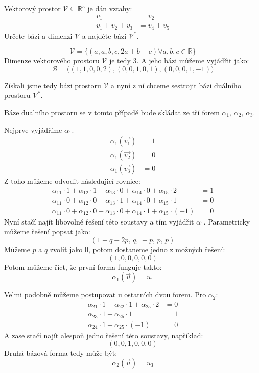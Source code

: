 \begin{example}
    Vektorový prostor $\mathcal{V} \subseteq \mathbb{R}^5$ je dán vztahy:
    \begin{align*}
        v_1 &= v_2\\
        v_1 + v_2 + v_3 &= v_4 + v_5
    \end{align*}
    Určete bázi a dimenzi $\mathcal{V}$ a najděte bázi $\mathcal{V}^*$.

    $$\mathcal{V} = \{(a, a, b, c, 2a + b -c) \forall a, b, c \in \mathbb{R}\}$$
    Dimenze vektorového prostoru $\mathcal{V}$ je  tedy 3.
    A jeho bázi můžeme vyjádřit jako:
    $$\mathcal{B} = \big( (1, 1, 0, 0, 2), (0, 0, 1, 0, 1), (0, 0, 0, 1, -1) \big)$$

    Získali jsme tedy bázi prostoru $\mathcal{V}$ a nyní z ní chceme sestrojit bázi duálního
    prostoru $\mathcal{V}^*$.

    Báze dualního prostoru se v tomto případě bude skládat ze tří forem $\alpha_1,\,\alpha_2,\,\alpha_3$.

    Nejprve vyjádříme $\alpha_1$.
    \begin{align*}
        \alpha_1(\vec{v_1}) &= 1\\
        \alpha_1(\vec{v_2}) &= 0\\
        \alpha_1(\vec{v_3}) &= 0
    \end{align*}
    Z toho můžeme odvodit následujicí rovnice:
    \begin{align*}
        \alpha_{11} \cdot 1 + \alpha_{12} \cdot 1 + \alpha_{13} \cdot 0 + \alpha_{14} \cdot 0 + \alpha_{15} \cdot 2 &= 1\\
        \alpha_{11} \cdot 0 + \alpha_{12} \cdot 0 + \alpha_{13} \cdot 1 + \alpha_{14} \cdot 0 + \alpha_{15} \cdot 1 &= 0\\
        \alpha_{11} \cdot 0 + \alpha_{12} \cdot 0 + \alpha_{13} \cdot 0 + \alpha_{14} \cdot 1 + \alpha_{15} \cdot (-1) &= 0
    \end{align*}
    Nyní stačí najít libovolné řešení této soustavy a tím vyjádřit $\alpha_1$.
    Parametricky můžeme řešení popsat jako:
    $$(1-q-2p,\, q,\, -p,\, p,\, p)$$
    Můžeme $p$ a $q$ zvolit jako 0, potom dostaneme jedno z možných řešení:
    $$(1, 0, 0, 0, 0, 0)$$
    Potom můžeme říct, že první forma funguje takto:
    $$\alpha_1(\vec{u}) = u_1$$

    Velmi podobně můžeme postupovat u ostatních dvou forem.
    Pro $\alpha_2$:
    \begin{align*}
        \alpha_{21} \cdot 1 + \alpha_{22} \cdot 1 + \alpha_{25} \cdot 2 &= 0\\
        \alpha_{23} \cdot 1 + \alpha_{25} \cdot 1 &= 1\\
        \alpha_{24} \cdot 1 + \alpha_{25} \cdot (-1) &= 0
    \end{align*}
    A zase stačí najít alespoň jedno řešení této soustavy, například:
    $$(0, 0, 1, 0, 0, 0)$$
    Druhá bázová forma tedy může být:
    $$\alpha_2(\vec{u}) = u_3$$


\end{example}
